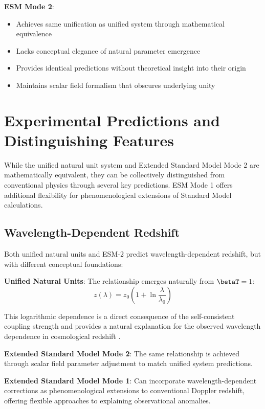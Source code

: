 	\textbf{ESM Mode 2}:
	\begin{itemize}
		\item Achieves same unification as unified system through mathematical equivalence
		\item Lacks conceptual elegance of natural parameter emergence
		\item Provides identical predictions without theoretical insight into their origin
		\item Maintains scalar field formalism that obscures underlying unity
	\end{itemize}
	
	\section{Experimental Predictions and Distinguishing Features}
	\label{sec:experimental_predictions}
	
	While the unified natural unit system and Extended Standard Model Mode 2 are mathematically equivalent, they can be collectively distinguished from conventional physics through several key predictions. ESM Mode 1 offers additional flexibility for phenomenological extensions of Standard Model calculations.
	
	\subsection{Wavelength-Dependent Redshift}
	\label{subsec:wavelength_dependent_redshift}
	
	Both unified natural units and ESM-2 predict wavelength-dependent redshift, but with different conceptual foundations:
	
	\textbf{Unified Natural Units}: The relationship emerges naturally from $\betaT = 1$:
	\begin{equation}
		z(\lambda) = z_0\left(1 + \ln\frac{\lambda}{\lambda_0}\right)
	\end{equation}
	
	This logarithmic dependence is a direct consequence of the self-consistent coupling strength and provides a natural explanation for the observed wavelength dependence in cosmological redshift \cite{pascher_unified_2025}.
	
	\textbf{Extended Standard Model Mode 2}: The same relationship is achieved through scalar field parameter adjustment to match unified system predictions.
	
	\textbf{Extended Standard Model Mode 1}: Can incorporate wavelength-dependent corrections as phenomenological extensions to conventional Doppler redshift, offering flexible approaches to explaining observational anomalies.
	

